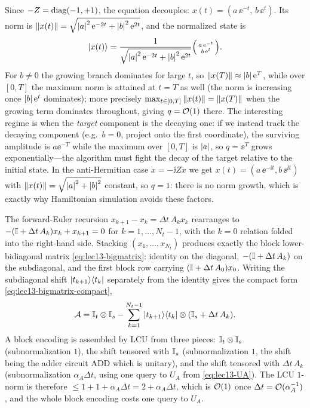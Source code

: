 \begin{solution}
Since $-Z=\operatorname{diag}(-1,+1)$, the equation decouples: $x(t)=(a\,\ee^{-t},\,b\,\ee^{t})$. Its norm is
$\left\lVert x(t) \right\rVert=\sqrt{\left\lvert a \right\rvert^2\mathrm{e}^{-2t}+\left\lvert b \right\rvert^2\mathrm{e}^{2t}}$, and the normalized state is
\[
  \ket{x(t)}=\frac{1}{\sqrt{\left\lvert a \right\rvert^2\mathrm{e}^{-2t}+\left\lvert b \right\rvert^2\mathrm{e}^{2t}}}
  \begin{psmallmatrix}a\,\mathrm{e}^{-t}\\ b\,\mathrm{e}^{t}\end{psmallmatrix}.
\]
For $b\ne0$ the growing branch dominates for large $t$, so $\left\lVert x(T) \right\rVert\approx\left\lvert b \right\rvert\mathrm{e}^{T}$,
while over $[0,T]$ the maximum norm is attained at $t=T$ as well (the norm is increasing once
$\left\lvert b \right\rvert\mathrm{e}^{t}$ dominates); more precisely $\max_{t\in[0,T]}\left\lVert x(t) \right\rVert=\left\lVert x(T) \right\rVert$ when the
growing term dominates throughout, giving $q=\mathcal{O}(1)$ there. The interesting regime is when the
\emph{target} component is the decaying one: if we instead track the decaying component (e.g.\
$b=0$, project onto the first coordinate), the surviving amplitude is $a\ee^{-T}$ while the
maximum over $[0,T]$ is $\left\lvert a \right\rvert$, so $q=\ee^{T}$ grows exponentially---the algorithm must fight
the decay of the target relative to the initial state. In the anti-Hermitian case
$\dot x=-\ii Zx$ we get $x(t)=(a\,\ee^{-\ii t},b\,\ee^{\ii t})$ with $\left\lVert x(t) \right\rVert=\sqrt{\left\lvert a \right\rvert^2
+\left\lvert b \right\rvert^2}$ constant, so $q=1$: there is no norm growth, which is exactly why Hamiltonian
simulation avoids these factors.
\end{solution}

\begin{solution}
The forward-Euler recursion $x_{k+1}-x_k=\Delta t\,A_k x_k$ rearranges to
$-(\mathbb{I}+\Delta t\,A_k)x_k+x_{k+1}=0$ for $k=1,\dots,N_t-1$, with the $k=0$ relation folded into
the right-hand side. Stacking $(x_1,\dots,x_{N_t})$ produces exactly the block lower-bidiagonal
matrix \eqref{eq:lec13-bigmatrix}: identity on the diagonal, $-(\mathbb{I}+\Delta t\,A_k)$ on the
subdiagonal, and the first block row carrying $(\mathbb{I}+\Delta t\,A_0)x_0$. Writing the subdiagonal
shift $\ket{t_{k+1}}\!\bra{t_k}$ separately from the identity gives the compact form
\eqref{eq:lec13-bigmatrix-compact},
\[
  \mathcal A=\mathbb{I}_t\otimes\mathbb{I}_s-\sum_{k=1}^{N_t-1}\ket{t_{k+1}}\!\bra{t_k}\otimes(\mathbb{I}_s+\Delta t\,A_k).
\]
A block encoding is assembled by LCU from three pieces: $\mathbb{I}_t\otimes\mathbb{I}_s$ (subnormalization
$1$), the shift tensored with $\mathbb{I}_s$ (subnormalization $1$, the shift being the adder circuit
$\mathrm{ADD}$ which is unitary), and the shift tensored with $\Delta t\,A_k$ (subnormalization
$\alpha_A\Delta t$, using one query to $U_A$ from \eqref{eq:lec13-UA}). The LCU $1$-norm is
therefore $\le1+1+\alpha_A\Delta t=2+\alpha_A\Delta t$, which is $\mathcal{O}(1)$ once
$\Delta t=\mathcal{O}(\alpha_A^{-1})$, and the whole block encoding costs one query to $U_A$.
\end{solution}

